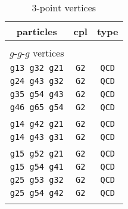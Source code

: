 \documentclass[a4paper,11pt]{article}
\begin{document}
\begin{table}
\begin{center}
\small
\caption{3-point vertices}
\label{3}
\begin{tabular}{ccc}
\hline
\hline
particles&cpl&type\\
\hline\\
$g$-$g$-$g$ vertices&&\\
{\tt g13 g32 g21}&{\tt G2}&{\tt QCD}\\
{\tt g24 g43 g32}&{\tt G2}&{\tt QCD}\\
{\tt g35 g54 g43}&{\tt G2}&{\tt QCD}\\
{\tt g46 g65 g54}&{\tt G2}&{\tt QCD}\\\\
{\tt g14 g42 g21}&{\tt G2}&{\tt QCD}\\
{\tt g14 g43 g31}&{\tt G2}&{\tt QCD}\\\\
{\tt g15 g52 g21}&{\tt G2}&{\tt QCD}\\
{\tt g15 g54 g41}&{\tt G2}&{\tt QCD}\\
{\tt g25 g53 g32}&{\tt G2}&{\tt QCD}\\
{\tt g25 g54 g42}&{\tt G2}&{\tt QCD}\\\\


\end{tabular}
\end{center}
\end{table}
\end{document}
